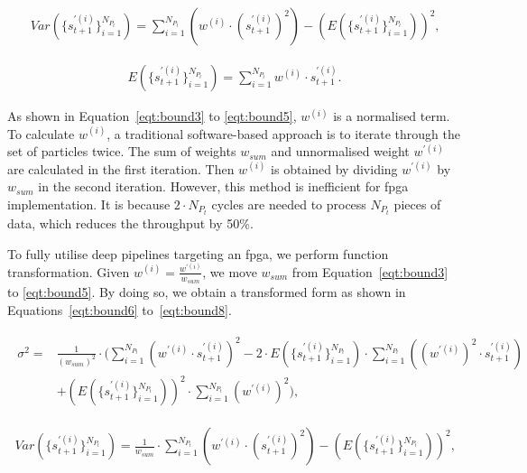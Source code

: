 \begin{equation}
\begin{aligned}
Var(\{s_{t+1}^{\prime(i)}\}^{N_{P_t}}_{i=1}) = \sum_{i=1}^{N_{P_t}} \left ( {w}^{(i)} \cdot (s_{t+1}^{\prime(i)})^2 \right ) - \left( E(\{s_{t+1}^{\prime(i)}\}^{N_{P_t}}_{i=1}) \right)^2 \mbox{,}
\end{aligned}
\label{eqt:bound4}
\end{equation}

\begin{equation}
\begin{aligned}
E(\{s_{t+1}^{\prime(i)}\}^{N_{P_t}}_{i=1}) = \sum_{i=1}^{N_{P_t}} {w}^{(i)} \cdot s_{t+1}^{\prime(i)} \mbox{.}
\end{aligned}
\label{eqt:bound5}
\end{equation}

As shown in Equation~\ref{eqt:bound3} to \ref{eqt:bound5}, ${w}^{(i)}$ is a normalised term. 
To calculate $w^{(i)}$, a traditional software-based approach is to iterate through the set of particles twice.
The sum of weights $w_{sum}$ and unnormalised weight $w^{\prime(i)}$ are calculated in the first iteration.
Then $w^{(i)}$ is obtained by dividing $w^{\prime(i)}$ by $w_{sum}$ in the second iteration.
However, this method is inefficient for \gls{fpga} implementation.
It is because $2 \cdot {N_{P_t}}$ cycles are needed to process ${N_{P_t}}$ pieces of data, which reduces the throughput by 50\%.

To fully utilise deep pipelines targeting an \gls{fpga}, we perform function transformation.
Given ${w}^{(i)} = \frac{w^{\prime(i)}}{w_{sum}}$, we move $w_{sum}$ from Equation~\ref{eqt:bound3} to \ref{eqt:bound5}.
By doing so, we obtain a transformed form as shown in Equations~\ref{eqt:bound6} to~\ref{eqt:bound8}.

\begin{eqnarray}
\begin{aligned}
\sigma^2 = & \frac{1}{(w_{sum})^2} \cdot \biggr( \sum_{i=1}^{N_{P_t}}\left(w^{\prime(i)} \cdot s_{t+1}^{\prime(i)} \right)^2 - 2 \cdot E(\{s_{t+1}^{\prime(i)}\}^{N_{P_t}}_{i=1}) \cdot \sum_{i=1}^{N_{P_t}} \left ( (w^{\prime(i)})^2 \cdot s_{t+1}^{\prime(i)} \right )\\
& + \left(E(\{s_{t+1}^{\prime(i)}\}^{N_{P_t}}_{i=1})\right)^2 \cdot \sum_{i=1}^{N_{P_t}}(w^{\prime(i)})^2 \biggr) \mbox{,}
\end{aligned}
\label{eqt:bound6}
\end{eqnarray}

\begin{equation}
\begin{aligned}
Var(\{s_{t+1}^{\prime(i)}\}^{N_{P_t}}_{i=1}) = \frac{1}{w_{sum}} \cdot \sum_{i=1}^{N_{P_t}} \left ( w^{\prime(i)} \cdot (s_{t+1}^{\prime(i)})^2 \right ) - \left( E(\{s_{t+1}^{\prime(i)}\}^{N_{P_t}}_{i=1}) \right)^2 \mbox{,}
\end{aligned}
\label{eqt:bound7}
\end{equation}

